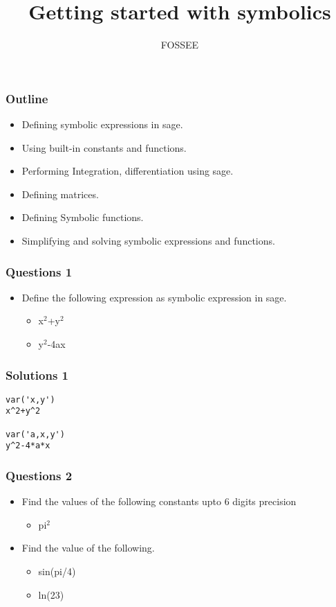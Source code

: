 \documentclass[presentation]{beamer}
\title{Getting started with symbolics}
\author{FOSSEE}
\date{}
\begin{document}
\maketitle









\begin{frame}
\frametitle{Outline}
\label{sec-1}

\begin{itemize}
\item Defining symbolic expressions in sage.
\item Using built-in constants and functions.
\item Performing Integration, differentiation using sage.
\item Defining matrices.
\item Defining Symbolic functions.
\item Simplifying and solving symbolic expressions and functions.
\end{itemize}
\end{frame}
\begin{frame}
\frametitle{Questions 1}
\label{sec-2}

\begin{itemize}
\item Define the following expression as symbolic
    expression in sage.

\begin{itemize}
\item x$^2$+y$^2$
\item y$^2$-4ax
\end{itemize}

\end{itemize}

  
\end{frame}
\begin{frame}[fragile]
\frametitle{Solutions 1}
\label{sec-3}

\begin{verbatim}
var('x,y')
x^2+y^2

var('a,x,y')
y^2-4*a*x
\end{verbatim}
\end{frame}
\begin{frame}
\frametitle{Questions 2}
\label{sec-4}

\begin{itemize}
\item Find the values of the following constants upto 6 digits  precision

\begin{itemize}
\item pi$^2$
\end{itemize}

\item Find the value of the following.

\begin{itemize}
\item sin(pi/4)
\item ln(23)
\end{itemize}

\end{itemize}
\end{frame}
\end{document}
